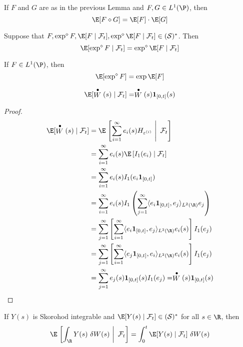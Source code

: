   \begin{corollary}
    If $F$ and $G$ are as in the previous Lemma and $F, G \in L^1(\P)$, then 
    \[
    \E [F \diamond G] = \E [F] \cdot \E[G]
    \]
  \end{corollary}

  \begin{corollary}
    Suppose that $F, \exp^\diamond F, \E [F \mid \mathcal{F}_t], \exp^\diamond \E [F \mid \mathcal{F}_t] \in (\mathcal{S})^\ast$. Then 
    \[
      \E [\exp^\diamond F \mid \mathcal{F}_t] = \exp^\diamond \E [F \mid \mathcal{F}_t]
    \]

    If $F \in L^1(\P)$, then 
    \[
      \E [\exp^\diamond F] = \exp \E [F]
    \]
  \end{corollary}

  \begin{lemma}\label{lm:202405061620}
    \[
      \E [\stackrel{\bullet}{W}(s) \mid \mathcal{F}_t] = \stackrel{\bullet}{W}(s) \mathbf{1}_{[0,t]}(s)
    \]
  \end{lemma}

\begin{proof}
\begin{equation*}
\begin{aligned}
\E [\stackrel{\bullet}{W}(s) \mid \mathcal{F}_t] &= \E \left.\left[ \sum_{i=1}^\infty e_i(s) H_{\varepsilon^{(i)}} ~\right|~ \mathcal{F}_t \right] \\
&= \sum_{i=1}^{\infty} e_i(s) \E \left[I_1(e_i) \mid \mathcal{F}_t\right] \\
&=\sum_{i=1}^{\infty} e_i(s) I_1(e_i \mathbf{1}_{[0, t]}) \\
& =\sum_{i=1}^{\infty} e_i(s) I_1\left(\sum_{j=1}^{\infty} \langle e_i \mathbf{1}_{[0, t]}, e_j \rangle_{L^2(\R)} e_j\right) \\
& =\sum_{j=1}^{\infty}\left[\sum_{i=1}^{\infty} \langle e_i \mathbf{1}_{[0, t]}, e_j \rangle_{L^2(\R)} e_i(s)\right] I_1(e_j) \\
& =\sum_{j=1}^{\infty}\left[\sum_{i=1}^{\infty} \langle e_j \mathbf{1}_{[0, t]}, e_i \rangle_{L^2(\R)} e_i(s)\right] I_1(e_j) \\
& =\sum_{j=1}^{\infty} e_j(s) \mathbf{1}_{[0, t]}(s) I_1(e_j) = \stackrel{\bullet}{W}(s) \mathbf{1}_{[0, t]}(s)
\end{aligned}
\end{equation*}
\end{proof}

  \begin{theorem}
    If $Y(s)$ is Skorohod integrable and $\E [Y(s) \mid \mathcal{F}_t] \in (\mathcal{S})^\ast$ for all $s \in \R$, then 
    \[
      \E \left. \left[ \int_\R Y(s) ~\delta W(s) ~\right|~ \mathcal{F}_t \right] = \int_0^t \E [Y(s) \mid \mathcal{F}_t] ~\delta W(s)
    \] 
  \end{theorem}

